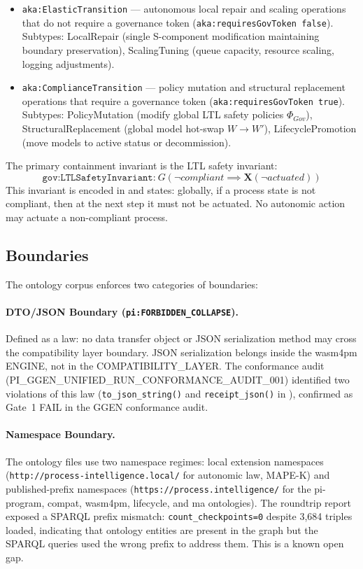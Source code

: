 \begin{itemize}
  \item \texttt{aka:ElasticTransition} --- autonomous local repair and scaling operations
        that do not require a governance token (\texttt{aka:requiresGovToken false}).
        Subtypes: LocalRepair (single S-component modification maintaining boundary
        preservation), ScalingTuning (queue capacity, resource scaling, logging adjustments).
  \item \texttt{aka:ComplianceTransition} --- policy mutation and structural replacement
        operations that require a governance token (\texttt{aka:requiresGovToken true}).
        Subtypes: PolicyMutation (modify global LTL safety policies $\Phi_{Gov}$),
        StructuralReplacement (global model hot-swap $W \to W'$), LifecyclePromotion
        (move models to active status or decommission).
\end{itemize}

The primary containment invariant is the LTL safety invariant:
\[
  \texttt{gov:LTLSafetyInvariant:}\ G(\neg\mathit{compliant} \implies \mathbf{X}(\neg\mathit{actuated}))
\]
This invariant is encoded in  and states: globally, if a process
state is not compliant, then at the next step it must not be actuated. No autonomic action
may actuate a non-compliant process.

\subsection{Boundaries}
\label{sec:research-open-ontologies-boundaries}

The ontology corpus enforces two categories of boundaries:

\paragraph{DTO/JSON Boundary (\texttt{pi:FORBIDDEN\_COLLAPSE}).}
Defined as a law: no data transfer object or JSON serialization method may cross the
compatibility layer boundary. JSON serialization belongs inside the wasm4pm ENGINE, not in
the COMPATIBILITY\_LAYER. The conformance audit (PI\_GGEN\_UNIFIED\_RUN\_CONFORMANCE\_AUDIT\_001)
identified two violations of this law (\texttt{to\_json\_string()} and \texttt{receipt\_json()}
in ), confirmed as Gate~1 FAIL in the GGEN conformance audit.

\paragraph{Namespace Boundary.}
The ontology files use two namespace regimes: local extension namespaces
(\texttt{http://process-intelligence.local/} for autonomic law, MAPE-K) and
published-prefix namespaces (\texttt{https://process.intelligence/} for the pi-program,
compat, wasm4pm, lifecycle, and ma ontologies). The roundtrip report exposed a SPARQL
prefix mismatch: \texttt{count\_checkpoints=0} despite 3{,}684 triples loaded, indicating
that ontology entities are present in the graph but the SPARQL queries used the wrong
prefix to address them. This is a known open gap.

